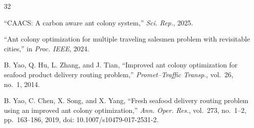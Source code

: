 \documentclass[lettersize,journal]{IEEEtran}
\begin{document}
\begin{thebibliography}{32}

``CAACS: A carbon aware ant colony system,'' \textit{Sci. Rep.}, 2025.


``Ant colony optimization for multiple traveling salesmen problem with revisitable cities,'' in \textit{Proc. IEEE}, 2024.


B. Yao, Q. Hu, L. Zhang, and J. Tian, ``Improved ant colony optimization for seafood product delivery routing problem,'' \textit{Promet--Traffic Transp.}, vol.~26, no.~1, 2014.


B. Yao, C. Chen, X. Song, and X. Yang, ``Fresh seafood delivery routing problem using an improved ant colony optimization,'' \textit{Ann. Oper. Res.}, vol.~273, no.~1--2, pp.~163--186, 2019, doi: 10.1007/s10479-017-2531-2.

\end{thebibliography}
\end{document}
